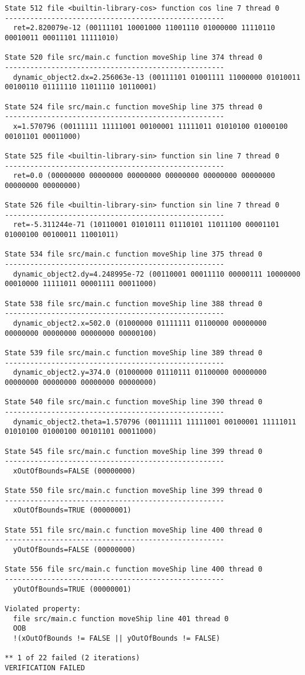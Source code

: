 \begin{verbatim}
State 512 file <builtin-library-cos> function cos line 7 thread 0
----------------------------------------------------
  ret=2.820079e-12 (00111101 10001000 11001110 01000000 11110110 00010011 00011101 11111010)

State 520 file src/main.c function moveShip line 374 thread 0
----------------------------------------------------
  dynamic_object2.dx=2.256063e-13 (00111101 01001111 11000000 01010011 00100110 01111110 11011110 10110001)

State 524 file src/main.c function moveShip line 375 thread 0
----------------------------------------------------
  x=1.570796 (00111111 11111001 00100001 11111011 01010100 01000100 00101101 00011000)

State 525 file <builtin-library-sin> function sin line 7 thread 0
----------------------------------------------------
  ret=0.0 (00000000 00000000 00000000 00000000 00000000 00000000 00000000 00000000)

State 526 file <builtin-library-sin> function sin line 7 thread 0
----------------------------------------------------
  ret=-5.311244e-71 (10110001 01010111 01110101 11011100 00001101 01000100 00100011 11001011)

State 534 file src/main.c function moveShip line 375 thread 0
----------------------------------------------------
  dynamic_object2.dy=4.248995e-72 (00110001 00011110 00000111 10000000 00010000 11111011 00001111 00011000)

State 538 file src/main.c function moveShip line 388 thread 0
----------------------------------------------------
  dynamic_object2.x=502.0 (01000000 01111111 01100000 00000000 00000000 00000000 00000000 00000100)

State 539 file src/main.c function moveShip line 389 thread 0
----------------------------------------------------
  dynamic_object2.y=374.0 (01000000 01110111 01100000 00000000 00000000 00000000 00000000 00000000)

State 540 file src/main.c function moveShip line 390 thread 0
----------------------------------------------------
  dynamic_object2.theta=1.570796 (00111111 11111001 00100001 11111011 01010100 01000100 00101101 00011000)

State 545 file src/main.c function moveShip line 399 thread 0
----------------------------------------------------
  xOutOfBounds=FALSE (00000000)

State 550 file src/main.c function moveShip line 399 thread 0
----------------------------------------------------
  xOutOfBounds=TRUE (00000001)

State 551 file src/main.c function moveShip line 400 thread 0
----------------------------------------------------
  yOutOfBounds=FALSE (00000000)

State 556 file src/main.c function moveShip line 400 thread 0
----------------------------------------------------
  yOutOfBounds=TRUE (00000001)

Violated property:
  file src/main.c function moveShip line 401 thread 0
  OOB
  !(xOutOfBounds != FALSE || yOutOfBounds != FALSE)

** 1 of 22 failed (2 iterations)
VERIFICATION FAILED
  
\end{verbatim}